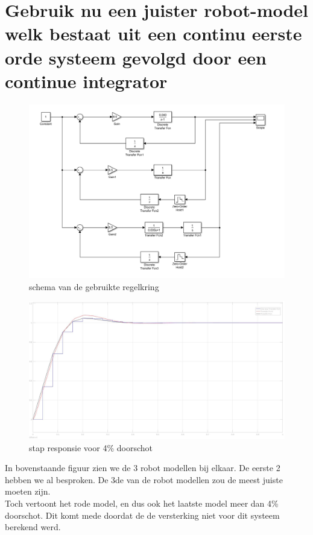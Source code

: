 \documentclass[a4paper, 12pt]{article}
\begin{document}
\section{Gebruik nu een juister robot-model welk bestaat uit een continu eerste orde systeem gevolgd door een continue integrator}

\begin{figure}[!h]
	\includegraphics[width=1\linewidth]{Labo3_5_systeem3.jpg}
	\caption{schema van de gebruikte regelkring}
\end{figure}

\begin{figure}[H]
	\includegraphics[width=1\linewidth]{Labo3_5_stapresponse4.jpg}
	\caption{stap responsie voor 4\% doorschot}
\end{figure}

In bovenstaande figuur zien we de 3 robot modellen bij elkaar. De eerste 2 hebben we al besproken. De 3de van de robot modellen zou de meest juiste moeten zijn. \\
Toch vertoont het rode model, en dus ook het laatste model meer dan 4\% doorschot. Dit komt mede doordat de de versterking niet voor dit systeem berekend werd.
\end{document}
